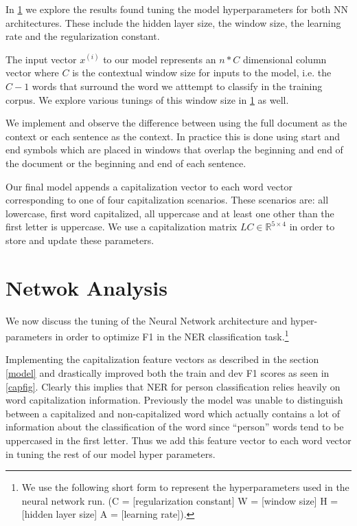 \documentclass{article}
\begin{document}
In \ref{netanalysis} we explore the results found tuning the model hyperparameters for both NN architectures. These include the hidden layer size, the window size, the learning rate and the regularization constant.

The input vector \(x^{(i)}\) to our model represents an \(n*C\) dimensional column vector where \(C\) is the contextual window size for inputs to the model, i.e. the \(C-1\) words that surround the word we atttempt to classify in the training corpus.  We explore various tunings of this window size in \ref{netanalysis} as well.  

We implement and observe the difference between using the full document as the context or each sentence as the context.  In practice this is done using start and end symbols which are placed in windows that overlap the beginning and end of the document or the beginning and end of each sentence.

Our final model appends a capitalization vector \cite{collobert} to each word vector corresponding to one of four capitalization scenarios.  These scenarios are: all lowercase, first word capitalized, all uppercase and at least one other than the first letter is uppercase.  We use a capitalization matrix \(LC\in\mathbb{R}^{5 \times 4}\) in order to store and update these parameters.

\section{Netwok Analysis}\label{netanalysis}
We now discuss the tuning of the Neural Network architecture and hyper-parameters in order to optimize F1 in the NER classification task.\footnote[1]{We use the following short form to represent the hyperparameters used in the neural network run. (C = [regularization constant] W = [window size] H = [hidden layer size] A = [learning rate]).}

Implementing the capitalization feature vectors as described in the section \ref{model} and \cite{collobert} drastically improved both the train and dev F1 scores as seen in \ref{capfig}.  Clearly this implies that NER for person classification relies heavily on word capitalization information.  Previously the model was unable to distinguish between a capitalized and non-capitalized word which actually contains a lot of information about the classification of the word since “person” words tend to be uppercased in the first letter.  Thus we add this feature vector to each word vector in tuning the rest of our model hyper parameters.
\end{document}
